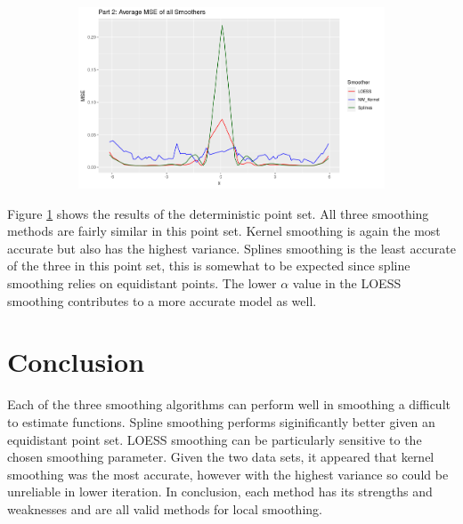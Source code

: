 \documentclass[12pt,letterpaper]{article}
\begin{document}
\begin{figure}[!htp]
\begin{subfigure}{0.45\textwidth}
    \end{subfigure}
    \begin{subfigure}{0.45\textwidth}
        \includegraphics[width=\textwidth]{p2_mse}
      \end{subfigure}
    \label{fig:part2}
\end{figure}

Figure \ref{fig:part2} shows the results of the deterministic point set. All three smoothing methods are fairly similar in this point set. Kernel smoothing is again the most accurate but also has the highest variance. Splines smoothing is the least accurate of the three in this point set, this is somewhat to be expected since spline smoothing relies on equidistant points. The lower $\alpha$ value in the LOESS smoothing contributes to a more accurate model as well. 

\section*{Conclusion}

Each of the three smoothing algorithms can perform well in smoothing a difficult to estimate functions. Spline smoothing performs siginificantly better given an equidistant point set. LOESS smoothing can be particularly sensitive to the chosen smoothing parameter. Given the two data sets, it appeared that kernel smoothing was the most accurate, however with the highest variance so could be unreliable in lower iteration. In conclusion, each method has its strengths and weaknesses and are all valid methods for local smoothing.
\end{document}
